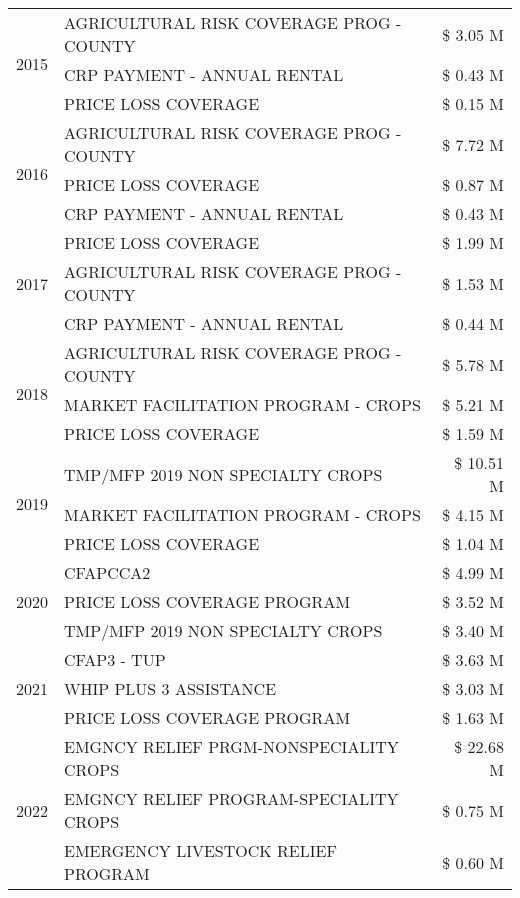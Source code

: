 \begin{tabular}{llr}
\cline{1-3}
\multirow[t]{3}{*}{2015} & AGRICULTURAL RISK COVERAGE PROG - COUNTY & \$ 3.05 M \\
 & CRP PAYMENT - ANNUAL RENTAL & \$ 0.43 M \\
 & PRICE LOSS COVERAGE & \$ 0.15 M \\
\cline{1-3}
\multirow[t]{3}{*}{2016} & AGRICULTURAL RISK COVERAGE PROG - COUNTY & \$ 7.72 M \\
 & PRICE LOSS COVERAGE & \$ 0.87 M \\
 & CRP PAYMENT - ANNUAL RENTAL & \$ 0.43 M \\
\cline{1-3}
\multirow[t]{3}{*}{2017} & PRICE LOSS COVERAGE & \$ 1.99 M \\
 & AGRICULTURAL RISK COVERAGE PROG - COUNTY & \$ 1.53 M \\
 & CRP PAYMENT - ANNUAL RENTAL & \$ 0.44 M \\
\cline{1-3}
\multirow[t]{3}{*}{2018} & AGRICULTURAL RISK COVERAGE PROG - COUNTY & \$ 5.78 M \\
 & MARKET FACILITATION PROGRAM - CROPS & \$ 5.21 M \\
 & PRICE LOSS COVERAGE & \$ 1.59 M \\
\cline{1-3}
\multirow[t]{3}{*}{2019} & TMP/MFP 2019 NON SPECIALTY CROPS & \$ 10.51 M \\
 & MARKET FACILITATION PROGRAM - CROPS & \$ 4.15 M \\
 & PRICE LOSS COVERAGE & \$ 1.04 M \\
\cline{1-3}
\multirow[t]{3}{*}{2020} & CFAPCCA2 & \$ 4.99 M \\
 & PRICE LOSS COVERAGE PROGRAM & \$ 3.52 M \\
 & TMP/MFP 2019 NON SPECIALTY CROPS & \$ 3.40 M \\
\cline{1-3}
\multirow[t]{3}{*}{2021} & CFAP3 - TUP & \$ 3.63 M \\
 & WHIP PLUS 3 ASSISTANCE & \$ 3.03 M \\
 & PRICE LOSS COVERAGE PROGRAM & \$ 1.63 M \\
\cline{1-3}
\multirow[t]{3}{*}{2022} & EMGNCY RELIEF PRGM-NONSPECIALITY CROPS & \$ 22.68 M \\
 & EMGNCY RELIEF PROGRAM-SPECIALITY CROPS & \$ 0.75 M \\
 & EMERGENCY LIVESTOCK RELIEF PROGRAM & \$ 0.60 M \\
\cline{1-3}
\bottomrule
\end{tabular}
